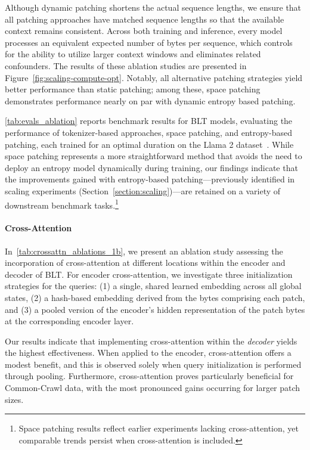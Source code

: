 Although dynamic patching shortens the actual sequence lengths, we ensure that all patching approaches have matched sequence lengths so that the available context remains consistent. Across both training and inference, every model processes an equivalent expected number of bytes per sequence, which controls for the ability to utilize larger context windows and eliminates related confounders. The results of these ablation studies are presented in Figure~\ref{fig:scaling-compute-opt}. Notably, all alternative patching strategies yield better performance than static patching; among these, space patching demonstrates performance nearly on par with dynamic entropy based patching.

\autoref{tab:evals_ablation} reports benchmark results for {\textsc BLT} models, evaluating the performance of tokenizer-based approaches, space patching, and entropy-based patching, each trained for an optimal duration on the Llama 2 dataset~\citep{dubey2024llama}. While space patching represents a more straightforward method that avoids the need to deploy an entropy model dynamically during training, our findings indicate that the improvements gained with entropy-based patching—previously identified in scaling experiments (Section~\ref{section:scaling})—are retained on a variety of downstream benchmark tasks.\footnote{Space patching results reflect earlier experiments lacking cross-attention, yet comparable trends persist when cross-attention is included.}

\paragraph{Cross-Attention} 
In~\autoref{tab:crossattn_ablations_1b}, we present an ablation study assessing the incorporation of cross-attention at different locations within the encoder and decoder of {\textsc BLT}. For encoder cross-attention, we investigate three initialization strategies for the queries: (1) a single, shared learned embedding across all global states, (2) a hash-based embedding derived from the bytes comprising each patch, and (3) a pooled version of the encoder's hidden representation of the patch bytes at the corresponding encoder layer.

Our results indicate that implementing cross-attention within the \textit{decoder} yields the highest effectiveness. When applied to the encoder, cross-attention offers a modest benefit, and this is observed solely when query initialization is performed through pooling. Furthermore, cross-attention proves particularly beneficial for Common-Crawl data, with the most pronounced gains occurring for larger patch sizes.

